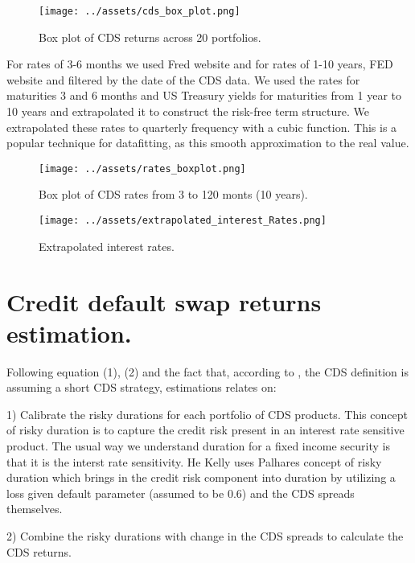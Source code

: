 \documentclass{article}
\begin{document}
\begin{Data science tools for finance final project}

\begin{figure}[H]
    \centering
    \texttt{[image: ../assets/cds\_box\_plot.png]}
    \caption{\label{fig:myplot}Box plot of CDS returns across 20 portfolios.}
    \end{figure}

For rates of 3-6 months we used Fred website and for rates of 1-10 years, FED website and filtered by the date of the CDS data. We used the rates for maturities 3 and 6 months and US Treasury yields for maturities from 1 year to 10 years and extrapolated it to construct the risk-free term structure.
We extrapolated these rates to quarterly frequency with a cubic function. This is a popular technique for datafitting, as this smooth approximation to the real value.

\begin{figure}[H]
    \centering
    \texttt{[image: ../assets/rates\_boxplot.png]}
    \caption{\label{fig:myplot}Box plot of CDS rates from 3 to 120 monts (10 years).}
    \end{figure}

\begin{figure}[H]
    \centering
    \texttt{[image: ../assets/extrapolated\_interest\_Rates.png]}
    \caption{\label{fig:myplot}Extrapolated interest rates.}
    \end{figure}    


\section{Credit default swap returns estimation.}
Following equation (1), (2) and the fact that, according to \cite{kelly2017}, the CDS definition is assuming a short CDS strategy, estimations relates on:

1) Calibrate the risky durations for each portfolio of CDS products. This concept of risky duration is to capture the credit risk present in an interest rate sensitive product. The usual way we understand duration for a fixed income security is that it is the interst rate sensitivity. He Kelly uses Palhares concept of risky duration which brings in the credit risk component into duration by utilizing a loss given default parameter (assumed to be 0.6) and the CDS spreads themselves. 

2) Combine the risky durations with change in the CDS spreads to calculate the CDS returns. 


\end{Data science tools for finance final project}
\end{document}
